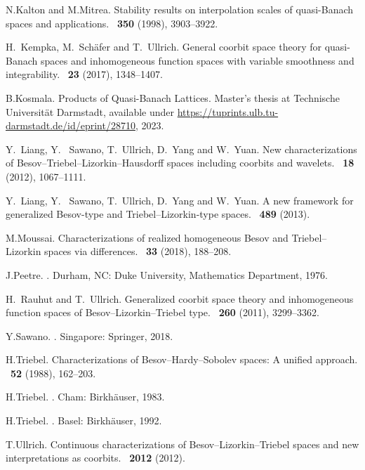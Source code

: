 \documentclass[11pt, leqno,parskip=half]{amsart}
\theoremstyle{definition}
\numberwithin{equation}{section}
\begin{document}
\begin{bibdiv}
\begin{biblist}
N.\@ Kalton and M.\@ Mitrea.
\newblock Stability results on interpolation scales of quasi-Banach spaces and applications.
~\textbf{350} (1998), 3903--3922.

H.~Kempka, M.~Sch{\"a}fer and T.~Ullrich.
\newblock General coorbit space theory for quasi-{Banach} spaces and inhomogeneous function spaces with variable smoothness and integrability.
~\textbf{23} (2017), 1348--1407.

B.\@ Kosmala.
\newblock Products of Quasi-Banach Lattices.
\newblock Master's thesis at Technische
Universität Darmstadt, available under \url{https://tuprints.ulb.tu-darmstadt.de/id/eprint/28710}, 2023.


Y.~Liang, Y.~ Sawano, T.~Ullrich, D.~Yang and W.~Yuan.
\newblock New characterizations of Besov--Triebel--Lizorkin--Hausdorff spaces including coorbits and wavelets.
~\textbf{18} (2012), 1067--1111.

Y.~Liang, Y.~ Sawano, T.~Ullrich, D.~Yang and W.~Yuan.
\newblock A new framework for generalized Besov-type and Triebel--Lizorkin-type spaces.
~\textbf{489} (2013).

M.\@ Moussai.
\newblock Characterizations of realized homogeneous Besov and
Triebel--Lizorkin spaces via differences.
~\textbf{33} (2018), 188--208.

J.\@ Peetre.
.
\newblock Durham, NC: Duke University, Mathematics Department, 1976.


H.~Rauhut and T.~Ullrich.
\newblock Generalized coorbit space theory and inhomogeneous function spaces of Besov--Lizorkin--Triebel type.
~\textbf{260} (2011), 3299--3362.

Y.\@ Sawano.
.
\newblock Singapore: Springer, 2018.

H.\@ Triebel.
\newblock Characterizations of Besov--Hardy--Sobolev spaces: A unified approach.
~\textbf{52} (1988), 162--203.

H.\@ Triebel.
.
\newblock Cham: Birkhäuser, 1983.

H.\@ Triebel.
.
\newblock Basel: Birkhäuser, 1992.

T.\@ Ullrich.
\newblock Continuous characterizations of Besov--Lizorkin--Triebel spaces and new interpretations as coorbits.
~\textbf{2012} (2012).

\end{biblist}
\end{bibdiv}
\end{document}

